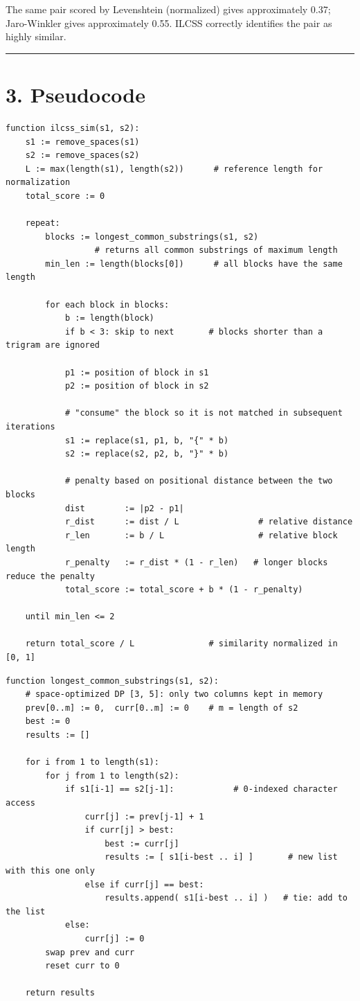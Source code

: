 \documentclass[
  11pt,
]{article}
\begin{document}
The same pair scored by Levenshtein (normalized) gives approximately
0.37; Jaro-Winkler gives approximately 0.55. ILCSS correctly identifies
the pair as highly similar.

\begin{center}\rule{0.5\linewidth}{0.5pt}\end{center}

\section{3. Pseudocode}\label{pseudocode}

\begin{verbatim}
function ilcss_sim(s1, s2):
    s1 := remove_spaces(s1)
    s2 := remove_spaces(s2)
    L := max(length(s1), length(s2))      # reference length for normalization
    total_score := 0

    repeat:
        blocks := longest_common_substrings(s1, s2)
                  # returns all common substrings of maximum length
        min_len := length(blocks[0])      # all blocks have the same length

        for each block in blocks:
            b := length(block)
            if b < 3: skip to next       # blocks shorter than a trigram are ignored

            p1 := position of block in s1
            p2 := position of block in s2

            # "consume" the block so it is not matched in subsequent iterations
            s1 := replace(s1, p1, b, "{" * b)
            s2 := replace(s2, p2, b, "}" * b)

            # penalty based on positional distance between the two blocks
            dist        := |p2 - p1|
            r_dist      := dist / L                # relative distance
            r_len       := b / L                   # relative block length
            r_penalty   := r_dist * (1 - r_len)   # longer blocks reduce the penalty
            total_score := total_score + b * (1 - r_penalty)

    until min_len <= 2

    return total_score / L               # similarity normalized in [0, 1]
\end{verbatim}

\begin{verbatim}
function longest_common_substrings(s1, s2):
    # space-optimized DP [3, 5]: only two columns kept in memory
    prev[0..m] := 0,  curr[0..m] := 0    # m = length of s2
    best := 0
    results := []

    for i from 1 to length(s1):
        for j from 1 to length(s2):
            if s1[i-1] == s2[j-1]:            # 0-indexed character access
                curr[j] := prev[j-1] + 1
                if curr[j] > best:
                    best := curr[j]
                    results := [ s1[i-best .. i] ]       # new list with this one only
                else if curr[j] == best:
                    results.append( s1[i-best .. i] )   # tie: add to the list
            else:
                curr[j] := 0
        swap prev and curr
        reset curr to 0

    return results
\end{verbatim}
\end{document}
